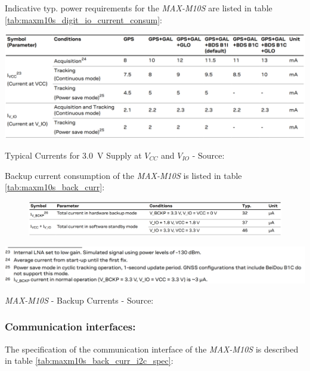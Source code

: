 \documentclass[report.tex]{subfiles}
\begin{document}
Indicative typ. power requirements for the \textit{MAX-M10S} are listed in table \ref{tab:maxm10s_digit_io_current_consum}:

\begin{table}[H]
	\centering
	\includegraphics[width=1\textwidth]{Include/Figure/comp/maxm10s_digit_io_current_consum.png}
\caption{Typical Currents for \SI{3.0}{\volt} Supply at $V_{CC}$ and $V_{IO}$ - Source: \cite{MAXM10S}}
\label{tab:maxm10s_digit_io_current_consum}
\end{table}

Backup current consumption of the \textit{MAX-M10S} is listed in table \ref{tab:maxm10s_back_curr}:

\begin{table}[H]
\begin{subfigure}{\textwidth}
	\centering
	\includegraphics[width=1\textwidth]{Include/Figure/comp/maxm10s_back_curr.png}
\end{subfigure}
	\centering
	\includegraphics[width=1\textwidth]{Include/Figure/comp/maxm10s_back_curr2.png}
\caption{\textit{MAX-M10S} - Backup Currents - Source: \cite{MAXM10S}}
\label{tab:maxm10s_back_curr}
\end{table}

\subsubsection{Communication interfaces:}

The specification of the communication interface of the \textit{MAX-M10S} is described in table \ref{tab:maxm10s_back_curr_i2c_spec}:
\end{document}
